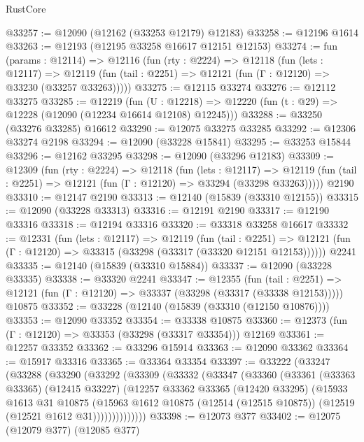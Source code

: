 \begin{lexlean}{RustCore}
\begin{coremodule}
@33257 := @12090 (@12162 (@33253 @12179) @12183)
@33258 := @12196 @1614
@33263 := @12193 (@12195 @33258 @16617 @12151 @12153)
@33274 := fun (params : @12114) =>
  @12116
    (fun (rty : @2224) =>
    @12118
      (fun (lets : @12117) =>
      @12119 (fun (tail : @2251) => @12121 (fun (Γ : @12120) => @33230 (@33257 @33263)))))
@33275 := @12115 @33274
@33276 := @12112 @33275
@33285 := @12219
    (fun (U : @12218) => @12220 (fun (t : @29) => @12228 (@12090 (@12234 @16614 @12108) @12245)))
@33288 := @33250 (@33276 @33285) @16612
@33290 := @12075 @33275 @33285
@33292 := @12306 @33274 @2198
@33294 := @12090 (@33228 @15841)
@33295 := @33253 @15844
@33296 := @12162 @33295
@33298 := @12090 (@33296 @12183)
@33309 := @12309
    (fun (rty : @2224) =>
    @12118
      (fun (lets : @12117) =>
      @12119 (fun (tail : @2251) => @12121 (fun (Γ : @12120) => @33294 (@33298 @33263)))))
    @2190
@33310 := @12147 @2190
@33313 := @12140 (@15839 (@33310 @12155))
@33315 := @12090 (@33228 @33313)
@33316 := @12191 @2190
@33317 := @12190 @33316
@33318 := @12194 @33316
@33320 := @33318 @33258 @16617
@33332 := @12331
    (fun (lets : @12117) =>
    @12119
      (fun (tail : @2251) =>
      @12121 (fun (Γ : @12120) => @33315 (@33298 (@33317 (@33320 @12151 @12153))))))
    @2241
@33335 := @12140 (@15839 (@33310 @15884))
@33337 := @12090 (@33228 @33335)
@33338 := @33320 @2241
@33347 := @12355
    (fun (tail : @2251) => @12121 (fun (Γ : @12120) => @33337 (@33298 (@33317 (@33338 @12153)))))
    @10875
@33352 := @33228 (@12140 (@15839 (@33310 (@12150 @10876))))
@33353 := @12090 @33352
@33354 := @33338 @10875
@33360 := @12373 (fun (Γ : @12120) => @33353 (@33298 (@33317 @33354))) @12169
@33361 := @12257 @33352
@33362 := @33296 @15914
@33363 := @12090 @33362
@33364 := @15917 @33316
@33365 := @33364 @33354
@33397 := @33222
    (@33247
      (@33288
        (@33290
          (@33292
            (@33309
              (@33332
                (@33347
                  (@33360
                    (@33361
                      (@33363 @33365)
                      (@12415 @33227)
                      (@12257
                        @33362
                        @33365
                        (@12420 @33295)
                        (@15933
                          @1613
                          @31
                          @10875
                          (@15963
                            @1612
                            @10875
                            (@12514 (@12515 @10875))
                            (@12519 (@12521 @1612 @31))))))))))))))
@33398 := @12073 @377
@33402 := @12075 (@12079 @377) (@12085 @377)

\end{coremodule}
\end{lexlean}
